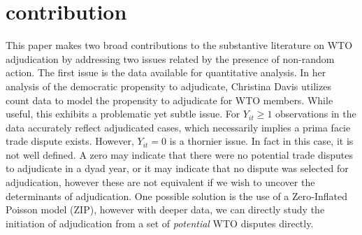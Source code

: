 \documentclass[]{article}
\begin{document}
\section{contribution}
This paper makes two broad contributions to the substantive literature on WTO adjudication by addressing two issues related by the presence of non-random action. The first issue is the data available for quantitative analysis. In her analysis of the democratic propensity to adjudicate, Christina Davis utilizes count data to model the propensity to adjudicate for WTO members. While useful, this exhibits a problematic yet subtle issue.  For $Y_{it}\geq 1$ observations in the data accurately reflect adjudicated cases, which necessarily implies a prima facie trade dispute exists. However, $Y_{it} = 0$ is a thornier issue. In fact in this case, it is not well defined. A zero may indicate that there were no potential trade disputes to adjudicate in a dyad year, or it may indicate that no dispute was selected for adjudication, however these are not equivalent if we wish to uncover the determinants of adjudication. One possible solution is the use of a Zero-Inflated Poisson model (ZIP), however with deeper data, we can directly study the initiation of adjudication from a set of \textit{potential} WTO disputes directly. \\
\end{document}
